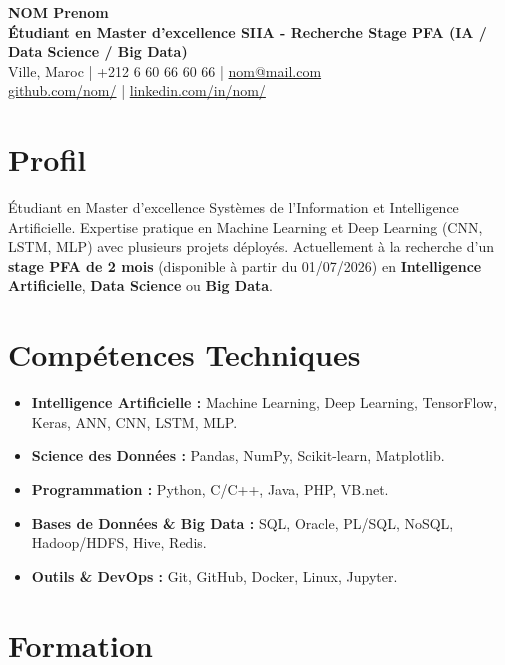 \documentclass[a4paper,10pt]{article}
\begin{document}
\begin{center}
    {\Huge \textbf{NOM Prenom}} \\
    \vspace{4pt}
    \textbf{Étudiant en Master d'excellence SIIA - Recherche Stage PFA (IA / Data Science / Big Data)} \\
    Ville, Maroc \quad | \quad +212 6 60 66 60 66 \quad | \quad \href{mailto:nom@email.com}{nom@mail.com} \\
    \href{https://github.com/nom/}{github.com/nom/} \quad | \quad \href{https://linkedin.com/in/nom/}{linkedin.com/in/nom/}
\end{center}

\section{Profil}
Étudiant en Master d'excellence Systèmes de l'Information et Intelligence Artificielle. Expertise pratique en Machine Learning et Deep Learning (CNN, LSTM, MLP) avec plusieurs projets déployés. Actuellement à la recherche d'un \textbf{stage PFA de 2 mois} (disponible à partir du 01/07/2026) en \textbf{Intelligence Artificielle}, \textbf{Data Science} ou \textbf{Big Data}.

\section{Compétences Techniques}
\begin{itemize}[leftmargin=*, noitemsep, topsep=0pt]
    \item \textbf{Intelligence Artificielle :} Machine Learning, Deep Learning, TensorFlow, Keras, ANN, CNN, LSTM, MLP.
    \item \textbf{Science des Données :} Pandas, NumPy, Scikit-learn, Matplotlib.
    \item \textbf{Programmation :} Python, C/C++, Java, PHP, VB.net.
    \item \textbf{Bases de Données \& Big Data :} SQL, Oracle, PL/SQL, NoSQL, Hadoop/HDFS, Hive, Redis.
    \item \textbf{Outils \& DevOps :} Git, GitHub, Docker, Linux, Jupyter.
\end{itemize}

\section{Formation}
\end{document}
